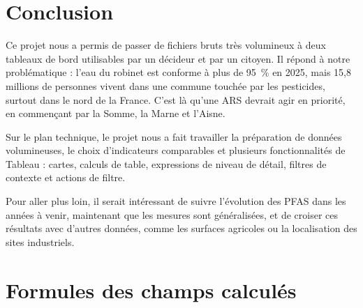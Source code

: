\documentclass[11pt,a4paper]{article}
\begin{document}
\section{Conclusion}

Ce projet nous a permis de passer de fichiers bruts très volumineux à deux tableaux de bord utilisables par un décideur et par un citoyen. Il répond à notre problématique : l'eau du robinet est conforme à plus de 95~\% en 2025, mais 15,8 millions de personnes vivent dans une commune touchée par les pesticides, surtout dans le nord de la France. C'est là qu'une ARS devrait agir en priorité, en commençant par la Somme, la Marne et l'Aisne.

Sur le plan technique, le projet nous a fait travailler la préparation de données volumineuses, le choix d'indicateurs comparables et plusieurs fonctionnalités de Tableau : cartes, calculs de table, expressions de niveau de détail, filtres de contexte et actions de filtre.

Pour aller plus loin, il serait intéressant de suivre l'évolution des PFAS dans les années à venir, maintenant que les mesures sont généralisées, et de croiser ces résultats avec d'autres données, comme les surfaces agricoles ou la localisation des sites industriels.

\appendix

\section{Formules des champs calculés}
\end{document}

